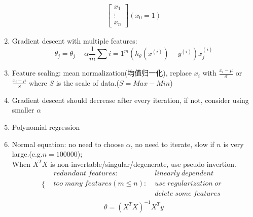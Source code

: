 \documentclass[UTF8]{ctexart}
\begin{document}
\begin{enumerate}
\[\begin{aligned}
\begin{bmatrix}
                      x_1    \\
                      \vdots \\
                      x_n
                  \end{bmatrix}
                  (x_0 = 1)
              \end{aligned}
          \]
    \item Gradient descent with multiple features:
          \[
              \theta_j = \theta_j - \alpha \frac{1}{m} \sum{i=1}^{m} (h_\theta(x^{(i)}) - y^{(i)}) x_j^{(i)}
          \]
    \item Feature scaling: mean normalization(均值归一化), replace $x_i$ with $\frac{x_i-\mu}{\sigma}$ or $\frac{x_i-\mu}{S}$ where $S$ is the scale of data.($S = Max - Min$)
    \item Gradient descent should decrease after every iteration, if not, consider using smaller $\alpha$
    \item Polynomial regression
    \item Normal equation:
          no need to choose $\alpha$, no need to iterate, slow if $n$ is very large.(e.g.$n = 100000$); \\
          When $X^{T}X$ is non-invertable/singular/degenerate, use pseudo invertion.
          \[
              \Bigg\{
              \begin{aligned}
                   & redundant\; features:\;            & linearly\; dependent        \\
                   & too\; many\; features(m \leq n):\; & use\; regularization\; or\; \\
                   &                                    & delete\; some\; features\;  \\
              \end{aligned}
          \]
          \[
              \theta = (X^{T}X)^{-1}X^{T}y
          \]
\end{enumerate}
\end{document}
